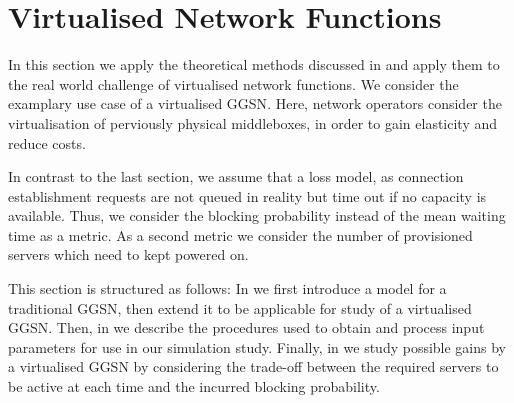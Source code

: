 \section{Virtualised Network Functions}\label{sec:cloud:virtualized_network_functions}
\newcommand{\blockingprobability}[0]{p_B}
\newcommand{\maxServers}[0]{S_{\max}}
In this section we apply the theoretical methods discussed in  and apply them to the real world challenge of virtualised network functions.
We consider the examplary use case of a virtualised \gls{GGSN}.
Here, network operators consider the virtualisation of perviously physical middleboxes, in order to gain elasticity and reduce costs.

In contrast to the last section, we assume that a loss model, as connection establishment requests are not queued in reality but time out if no capacity is available.
Thus, we consider the blocking probability instead of the mean waiting time as a metric.
As a second metric we consider the number of provisioned servers which need to kept powered on. 

This section is structured as follows:
In  we first introduce a model for a traditional \gls{GGSN}, then extend it to be applicable for study of a virtualised \gls{GGSN}.
Then, in  we describe the procedures used to obtain and process input parameters for use in our simulation study.
Finally, in  we study possible gains by a virtualised \gls{GGSN} by considering the trade-off between the required servers to be active at each time and the incurred blocking probability. 



